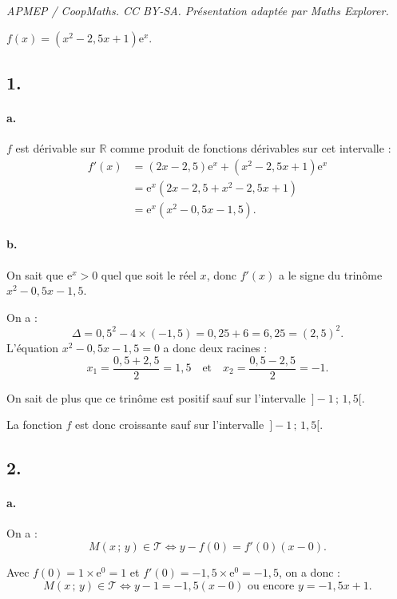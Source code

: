 \documentclass[10pt]{article}
\providecommand{\e}{{\mathrm{e}}}
\begin{document}
\noindent\textit{APMEP / CoopMaths. CC BY-SA. Présentation adaptée par Maths Explorer.}\par\medskip
\( f(x) = (x^2 - 2{,}5x + 1) \e^x \).

\subsection*{1.}

\paragraph{a.} \(f\) est dérivable sur \( \mathbb{R} \) comme produit de fonctions dérivables sur cet intervalle :
\begin{align*}
f'(x) &= (2x - 2{,}5) \e^x + (x^2 - 2{,}5x + 1) \e^x \\
&= \e^x (2x - 2{,}5 + x^2 - 2{,}5x + 1) \\
&= \e^x (x^2 - 0{,}5x - 1{,}5).
\end{align*}

\paragraph{b.} On sait que \( \e^x > 0 \) quel que soit le réel \( x \), donc \( f'(x) \) a le signe du trinôme \( x^2 - 0{,}5x - 1{,}5 \).

On a :
\[
\Delta = 0{,}5^2 - 4 \times (-1{,}5) = 0{,}25 + 6 = 6{,}25 = (2{,}5)^2.
\]
L'équation \( x^2 - 0{,}5x - 1{,}5 = 0 \) a donc deux racines :
\[
x_1 = \dfrac{0{,}5 + 2{,}5}{2} = 1{,}5 \quad \text{et} \quad x_2 = \dfrac{0{,}5 - 2{,}5}{2} = -1.
\]

On sait de plus que ce trinôme est positif sauf sur l'intervalle \( \,] -1 \,;\, 1{,}5[ \).

La fonction \(f\) est donc croissante sauf sur l'intervalle \( \,] -1 \,;\, 1{,}5[ \).

\subsection*{2.}

\paragraph{a.} On a :
\[
M(x \,;\, y) \in \mathcal{T} \iff y - f(0) = f'(0)(x - 0).
\]

Avec \(f(0) = 1 \times \e^0 = 1\) et \(f'(0) = -1{,}5 \times \e^0 = -1{,}5\), on a donc :
\[
M(x \,;\, y) \in \mathcal{T} \iff y - 1 = -1{,}5(x - 0) \text{ ou encore } y = -1{,}5x + 1.
\]
\end{document}
